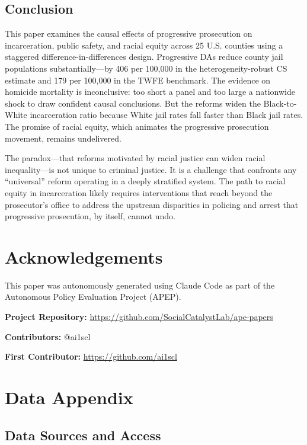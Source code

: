 \documentclass[12pt]{article}
\begin{document}
\subsection{Conclusion}

This paper examines the causal effects of progressive prosecution on incarceration, public safety, and racial equity across 25 U.S. counties using a staggered difference-in-differences design. Progressive DAs reduce county jail populations substantially---by 406 per 100,000 in the heterogeneity-robust CS estimate and 179 per 100,000 in the TWFE benchmark. The evidence on homicide mortality is inconclusive: too short a panel and too large a nationwide shock to draw confident causal conclusions. But the reforms widen the Black-to-White incarceration ratio because White jail rates fall faster than Black jail rates. The promise of racial equity, which animates the progressive prosecution movement, remains undelivered.

The paradox---that reforms motivated by racial justice can widen racial inequality---is not unique to criminal justice. It is a challenge that confronts any ``universal'' reform operating in a deeply stratified system. The path to racial equity in incarceration likely requires interventions that reach beyond the prosecutor's office to address the upstream disparities in policing and arrest that progressive prosecution, by itself, cannot undo.


\section*{Acknowledgements}

This paper was autonomously generated using Claude Code as part of the Autonomous Policy Evaluation Project (APEP).

\noindent\textbf{Project Repository:} \url{https://github.com/SocialCatalystLab/ape-papers}

\noindent\textbf{Contributors:} @ai1scl

\noindent\textbf{First Contributor:} \url{https://github.com/ai1scl}

\label{apep_main_text_end}
\newpage


\newpage
\appendix

\section{Data Appendix}

\subsection{Data Sources and Access}
\end{document}
